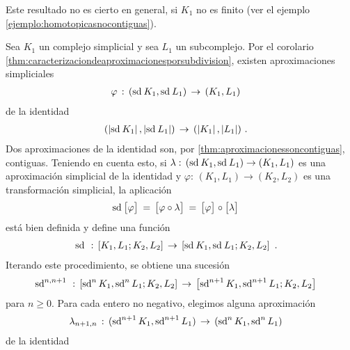 Este resultado no es cierto en general, si $K_{1}$ no es finito (ver el
ejemplo \ref{ejemplo:homotopicasnocontiguas}).

\begin{obsLimiteDirectoDeSubdivisiones}\label{obs:limitedirectodesubdivisiones}
	Sea $K_{1}$ un complejo simplicial y sea $L_{1}$ un subcomplejo. Por
	el corolario \ref{thm:caracterizaciondeaproximacionesporsubdivision},
	existen aproximaciones simpliciales
	\begin{align*}
		\varphi & \,:\,(\subdiv{K_{1}},\subdiv{L_{1}})\,\rightarrow\,
			(K_{1},L_{1})
	\end{align*}
	de la identidad
	\begin{align*}
		& (\geom{\subdiv{K_{1}}},\geom{\subdiv{L_{1}}})\,\rightarrow\,
			(\geom{K_{1}},\geom{L_{1}})
		\text{ .}
	\end{align*}
	Dos aproximaciones de la identidad son, por
	\ref{thm:aproximacionessoncontiguas}, contiguas. Teniendo en cuenta
	esto, si
	\begin{math}
		\lambda:\,(\subdiv{K_{1}},\subdiv{L_{1}})\rightarrow
			(K_{1},L_{1})
	\end{math}
	es una aproximaci\'{o}n simplicial de la identidad y
	$\varphi:\,(K_{1},L_{1})\rightarrow (K_{2},L_{2})$ es una
	transformaci\'{o}n simplicial, la aplicaci\'{o}n
	\begin{align*}
		\subdiv{\clase{\varphi}} & \,=\,\clase{\varphi\circ\lambda}
			\,=\,\clase{\varphi}\circ\clase{\lambda}
	\end{align*}
	est\'{a} bien definida y define una funci\'{o}n
	\begin{align*}
		\subdiv{\null} & \,:\,
			\contiguas{K_{1},L_{1}}{K_{2},L_{2}}\,\rightarrow\,
			\contiguas{\subdiv{K_{1}},\subdiv{L_{1}}}{K_{2},L_{2}}
		\text{ .}
	\end{align*}
	Iterando este procedimiento, se obtiene una sucesi\'{o}n
	\begin{align*}
		\subdiv[n,n+1]{\null} & \,:\,
			\contiguas{\subdiv[n]{K_{1}},\subdiv[n]{L_{1}}}%
				{K_{2},L_{2}}\,\rightarrow\,
			\contiguas{\subdiv[n+1]{K_{1}},\subdiv[n+1]{L_{1}}}%
				{K_{2},L_{2}}
	\end{align*}
	para $n\geq 0$. Para cada entero no negativo, elegimos alguna
	aproximaci\'{o}n
	\begin{align*}
		\lambda_{n+1,n} & \,:\,
			(\subdiv[n+1]{K_{1}},\subdiv[n+1]{L_{1}})
			\,\rightarrow\,
			(\subdiv[n]{K_{1}},\subdiv[n]{L_{1}})
	\end{align*}
	de la identidad
	\begin{align*}

\end{align*}
\end{obsLimiteDirectoDeSubdivisiones}
